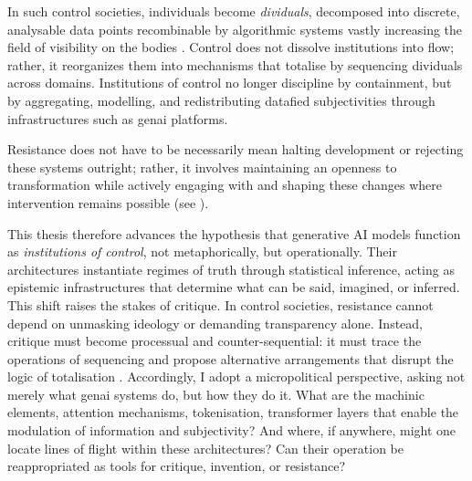 In such control societies, individuals become \emph{dividuals}, decomposed into discrete, analysable data points recombinable by algorithmic systems \parencite{mackenzie2021} vastly increasing the field of visibility on the bodies \parencite{foucault2008}. Control does not dissolve institutions into flow; rather, it reorganizes them into mechanisms that totalise by sequencing dividuals across domains. Institutions of control no longer discipline by containment, but by aggregating, modelling, and redistributing datafied subjectivities through infrastructures such as \gls{genai} platforms.

Resistance does not have to be necessarily mean halting development or rejecting these systems outright; rather, it involves maintaining an openness to transformation while actively engaging with and shaping these changes where intervention remains possible (see \cite[227]{tucker2021}).



This thesis therefore advances the hypothesis that generative AI models function as \emph{institutions of control}, not metaphorically, but operationally. Their architectures instantiate regimes of truth through statistical inference, acting as epistemic infrastructures that determine what can be said, imagined, or inferred. This shift raises the stakes of critique. In control societies, resistance cannot depend on unmasking ideology or demanding transparency alone. Instead, critique must become processual and counter-sequential: it must trace the operations of sequencing and propose alternative arrangements that disrupt the logic of totalisation \parencite{mackenzie2021} . Accordingly, I adopt a micropolitical perspective, asking not merely what \gls{genai} systems do, but how they do it. What are the machinic elements, attention mechanisms, tokenisation, transformer layers that enable the modulation of information and subjectivity? And where, if anywhere, might one locate lines of flight within these architectures? Can their operation be reappropriated as tools for critique, invention, or resistance?

